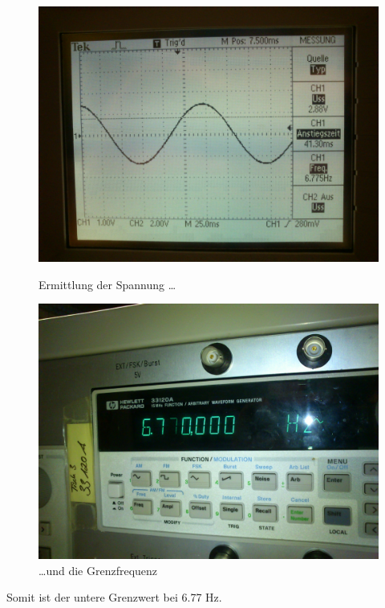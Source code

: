 \begin{figure}[H]
	\begin{minipage}[b]{0.5\linewidth}
		\centering
		\includegraphics[width=\linewidth]{versuch3/oszi/DSC_0295.JPG}
		\caption{Ermittlung der Spannung \ldots}
	\end{minipage}
	\hspace{0.5cm}
	\begin{minipage}[b]{0.5\linewidth}
		\includegraphics[width=\linewidth]{versuch3/oszi/DSC_0294.JPG}
		\caption{\ldots und die Grenzfrequenz}
		\centering
	\end{minipage}
\end{figure}
Somit ist der untere Grenzwert bei 6.77 Hz.

